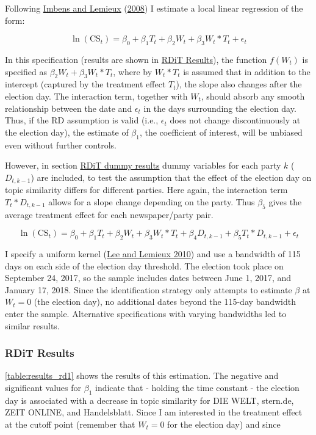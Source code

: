 \documentclass[
]{article}
\begin{document}
Following \protect\hyperlink{ref-imbens_regression_2008}{Imbens and
Lemieux} (\protect\hyperlink{ref-imbens_regression_2008}{2008}) I
estimate a local linear regression of the form:

\[
\ln(\text{CS}_{t})=\beta_0+\beta_1T_t+\beta_2W_t+\beta_3W_t*T_t+\epsilon_t
\]

In this specification (results are shown in
\protect\hyperlink{RDiT-Results}{RDiT Results}), the function \(f(W_t)\)
is specified as \(\beta_2W_t+\beta_3W_t*T_t\), where by \(W_t*T_t\) is
assumed that in addition to the intercept (captured by the treatment
effect \(T_t\)), the slope also changes after the election day. The
interaction term, together with \(W_t\), should absorb any smooth
relationship between the date and \(\epsilon_t\) in the days surrounding
the election day. Thus, if the RD assumption is valid (i.e.,
\(\epsilon_t\) does not change discontinuously at the election day), the
estimate of \(\beta_1\), the coefficient of interest, will be unbiased
even without further controls.

However, in section \protect\hyperlink{RDiT-dummy-results}{RDiT dummy
results} dummy variables for each party \(k\) (\(D_{t,k-1}\)) are
included, to test the assumption that the effect of the election day on
topic similarity differs for different parties. Here again, the
interaction term \(T_t*D_{t,k-1}\) allows for a slope change depending
on the party. Thus \(\beta_5\) gives the average treatment effect for
each newspaper/party pair.

\[
\ln(\text{CS}_{t})=\beta_0+\beta_1T_t+\beta_2W_{t}+\beta_3W_t*T_t+\beta_4D_{t,k-1}+\beta_5T_t*D_{t,k-1}+\epsilon_t
\]

I specify a uniform kernel
(\protect\hyperlink{ref-lee_regression_2010}{Lee and Lemieux 2010}) and
use a bandwidth of 115 days on each side of the election day threshold.
The election took place on September 24, 2017, so the sample includes
dates between June 1, 2017, and January 17, 2018. Since the
identification strategy only attempts to estimate \(\beta\) at \(W_t=0\)
(the election day), no additional dates beyond the 115-day bandwidth
enter the sample. Alternative specifications with varying bandwidths led
to similar results.

\hypertarget{rdit-results}{%
\subsubsection{RDiT Results}\label{rdit-results}}

\autoref{table:results_rd1} shows the results of this estimation. The
negative and significant values for \(\beta_1\) indicate that - holding
the time constant - the election day is associated with a decrease in
topic similarity for DIE WELT, stern.de, ZEIT ONLINE, and Handelsblatt.
Since I am interested in the treatment effect at the cutoff point
(remember that \(W_t=0\) for the election day) and since
\end{document}
